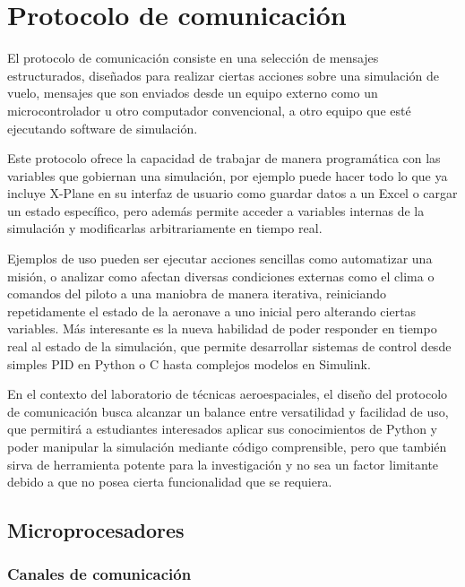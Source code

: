\chapter{Protocolo de comunicación}

El protocolo de comunicación consiste en una selección de mensajes estructurados, diseñados para realizar ciertas acciones sobre una simulación de vuelo, mensajes que son enviados desde un equipo externo como un microcontrolador u otro computador convencional, a otro equipo que esté ejecutando software de simulación.

Este protocolo ofrece la capacidad de trabajar de manera programática con las variables que gobiernan una simulación, por ejemplo puede hacer todo lo que ya incluye X-Plane en su interfaz de usuario como guardar datos a un Excel o cargar un estado específico, pero además permite acceder a variables internas de la simulación y modificarlas arbitrariamente en tiempo real.

Ejemplos de uso pueden ser ejecutar acciones sencillas como automatizar una misión, o analizar como afectan diversas condiciones externas como el clima o comandos del piloto a una maniobra de manera iterativa, reiniciando repetidamente el estado de la aeronave a uno inicial pero alterando ciertas variables. Más interesante es la nueva habilidad de poder responder en tiempo real al estado de la simulación, que permite desarrollar sistemas de control desde simples PID en Python o C hasta complejos modelos en Simulink.

En el contexto del laboratorio de técnicas aeroespaciales, el diseño del protocolo de comunicación busca alcanzar un balance entre versatilidad y facilidad de uso, que permitirá a estudiantes interesados aplicar sus conocimientos de Python y poder manipular la simulación mediante código comprensible, pero que también sirva de herramienta potente para la investigación y no sea un factor limitante debido a que no posea cierta funcionalidad que se requiera.

\section{Microprocesadores}

\subsection{Canales de comunicación}

